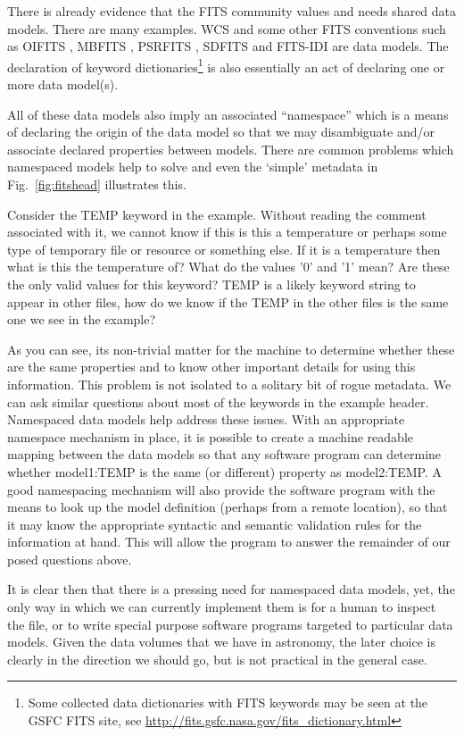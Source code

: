 \documentclass[final,authoryear,5p,times,twocolumn]{elsarticle}
\begin{document}
{{There is already evidence that the FITS community values and needs shared
data models. There are many examples. WCS and some other FITS conventions
such as OIFITS
\citep{2006SPIE.6268E.106T}, MBFITS \citep{2006A&A...454L..25M},
PSRFITS \citep{2004PASA...21..302H},
SDFITS \citep{2000ASPC..216..243G} and FITS-IDI \citep{2011AIPS114}
are data models. The declaration of keyword
dictionaries\footnote{Some collected data dictionaries with FITS
keywords may be seen at the GSFC FITS site, see
\url{http://fits.gsfc.nasa.gov/fits\_dictionary.html}} is also essentially
an act of declaring one or more data model(s).


All of these data models also imply an associated ``namespace'' which is
a means of declaring the origin of the data model so that we may
disambiguate and/or associate declared properties between models.
There are common problems which namespaced models help to solve and even
the `simple' metadata in Fig.~\ref{fig:fitshead} illustrates this.


Consider the TEMP keyword in the example. Without reading the comment
associated with it, we cannot know if this is this a temperature or perhaps
some type of temporary file or resource or something else. If it is a
temperature then what is this the temperature of? What do the values '0'
and '1' mean? Are these the only valid values for this keyword?  TEMP is
a likely keyword string to appear in other files, how do we know if the
TEMP in the other files is the same one we see in the example?


As you can see, its non-trivial matter for the machine to determine whether
these are the same properties and to know other important details for using
this information. This problem is not isolated to a solitary bit
of rogue metadata. We can ask similar questions about most of the keywords
in the example header. Namespaced data models help address these issues. With
an appropriate namespace mechanism in place, it is possible to create a
machine readable mapping between the data models so that any software program
can determine whether model1:TEMP is the same (or different) property as
model2:TEMP. A good namespacing mechanism will also provide the
software program with the means to look up the model definition (perhaps from
a remote location), so that it may know the appropriate syntactic and semantic
validation rules for the information at hand. This will allow the program to
answer the remainder of our posed questions above.


It is clear then that there is a pressing need for namespaced data models,
yet, the only way in which we can currently implement them is for a human
to inspect the file, or to write special purpose software programs targeted to
particular data models. Given the data volumes that we have in astronomy, the
later choice is clearly in the direction we should go, but is not practical
in the general case.


}}
\end{document}
